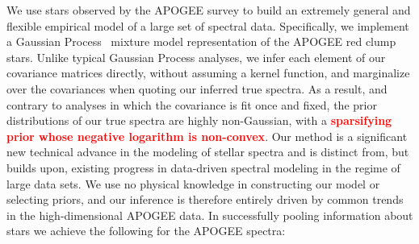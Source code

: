 \documentclass[a4paper,fleqn,usenatbib]{mnras}
\newcommand\edit[1]{\textcolor{red}{\textbf{#1}}}
\begin{document}
We use stars observed by the APOGEE survey to build an extremely general and flexible empirical model of a large set of spectral data. Specifically, we implement a Gaussian Process~\citep{Rasmussen_Williams} mixture model representation of the APOGEE red clump stars. Unlike typical Gaussian Process analyses, we infer each element of our covariance matrices directly, without assuming a kernel function, and marginalize over the covariances when quoting our inferred true spectra. As a result, and contrary to analyses in which the covariance is fit once and fixed, the prior distributions of our true spectra are highly non-Gaussian, with a \edit{sparsifying prior whose negative logarithm is non-convex}. Our method is a significant new technical advance in the modeling of stellar spectra and is distinct from, but builds upon, existing progress in data-driven spectral modeling in the regime of large data sets. We use no physical knowledge in constructing our model or selecting priors, and our inference is therefore entirely driven by common trends in the high-dimensional APOGEE data. In successfully pooling information about stars we achieve the following for the APOGEE spectra:
\end{document}
